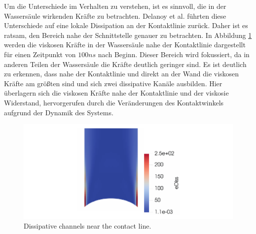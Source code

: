 Um die Unterschiede im Verhalten zu verstehen, ist es sinnvoll, die in der Wassersäule wirkenden Kräfte zu betrachten. Delanoy et al. \cite{delannoy2019DualRoleViscosity} führten diese Unterschiede auf eine lokale Dissipation an der Kontaktlinie zurück. Daher ist es ratsam, den Bereich nahe der Schnittstelle genauer zu betrachten. In Abbildung \ref{fig: eDiss_wedge} werden die viskosen Kräfte in der Wassersäule nahe der Kontaktlinie dargestellt für einen Zeitpunkt von $100ns$ nach Beginn. Dieser Bereich wird fokussiert, da in anderen Teilen der Wassersäule die Kräfte deutlich geringer sind. Es ist deutlich zu erkennen, dass nahe der Kontaktlinie und direkt an der Wand die viskosen Kräfte am größten sind und sich zwei dissipative Kanäle ausbilden. Hier überlagern sich die viskosen Kräfte nahe der Kontaktlinie und der viskosie Widerstand, hervorgerufen durch die Veränderungen des Kontaktwinkels aufgrund der Dynamik des Systems. 

\begin{figure}[h]
    \centering
    \includegraphics[width=.95\textwidth]{Pictures/eDiss_Wedge.pdf}
    \caption{Dissipative channels near the contact line.}
    \label{fig: eDiss_wedge}
\end{figure}

